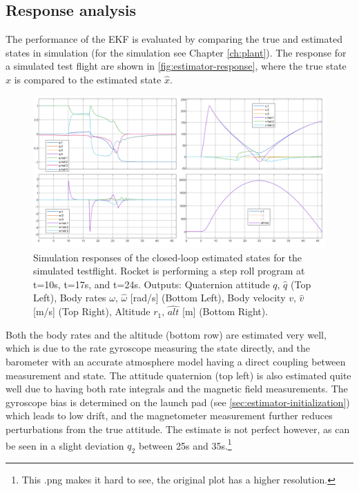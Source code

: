 \subsection{Response analysis}
The performance of the EKF is evaluated by comparing the true and estimated states in simulation (for the simulation see Chapter \ref{ch:plant}).
The response for a simulated test flight are shown in \autoref{fig:estimator-response}, where the true state $x$ is compared to the estimated state $\hat x$.
\begin{figure}[ht!]
    \centering
    \includegraphics[width=\textwidth]{images-design/estimator-simulation.png}
    \caption[Closed-loop estimation responses]{Simulation responses of the closed-loop estimated states for the simulated testflight. Rocket is performing a step roll program at t=10s, t=17s, and t=24s. Outputs: Quaternion attitude $q, \, \hat q$ (Top Left),  Body rates $\omega, \, \hat \omega$ [rad/s] (Bottom Left), Body velocity $v, \, \hat v$ [m/s] (Top Right), Altitude $r_1, \, \hat {alt}$ [m] (Bottom Right).}
    \label{fig:estimator-response}
\end{figure}
Both the body rates and the altitude (bottom row) are estimated very well, which is due to the rate gyroscope measuring the state directly, and the barometer with an accurate atmosphere model having a direct coupling between measurement and state.
The attitude quaternion (top left) is also estimated quite well due to having both rate integrals and the magnetic field measurements. 
The gyroscope bias is determined on the launch pad (see \autoref{sec:estimator-initialization}) which leads to low drift, and the magnetometer measurement further reduces perturbations from the true attitude.
The estimate is not perfect however, as can be seen in a slight deviation $q_2$ between 25s and 35s.\footnote{This .png makes it hard to see, the original plot has a higher resolution.}
